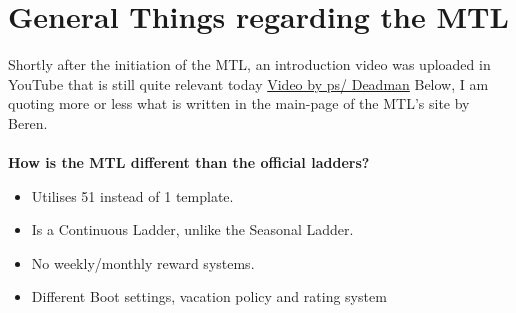 \newpage
\section{General Things regarding the MTL}

Shortly after the initiation of the MTL, an introduction video was uploaded in YouTube that is still quite relevant today \href{https://www.youtube.com/watch?v=1EAWWs78sYI}{Video by ps/ Deadman} Below, I am quoting more or less what is written in the main-page of the MTL's site by Beren.
\\
\\
\textbf{How is the MTL different than the official ladders?}
\begin{itemize}
    \item Utilises 51 instead of 1 template.
    \item Is a Continuous Ladder, unlike the Seasonal Ladder.
    \item No weekly/monthly reward systems.
    \item Different Boot settings, vacation policy and rating system
\end{itemize}

